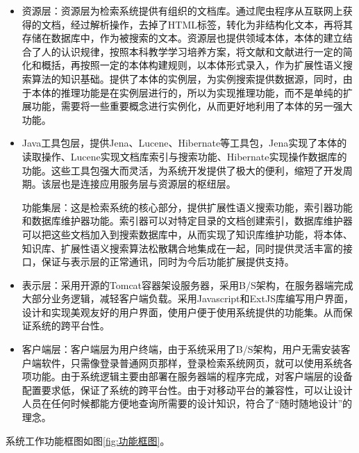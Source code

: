 \documentclass[12pt,a4paper]{article}
\begin{document}
	\begin{itemize}
	 	\item
	资源层：资源层为检索系统提供有组织的文档库。通过爬虫程序从互联网上获得的文档，经过解析操作，去掉了{\Times HTML}标签，转化为非结构化文本，再将其存储在数据库中，作为被搜索的文本。资源层也提供领域本体，本体的建立结合了人的认识规律，按照本科教学学习培养方案，将文献\cite{2005shen}和文献\cite{2008liu}进行一定的简化和概括，再按照一定的本体构建规则，以本体形式录入，作为扩展性语义搜索算法的知识基础。提供了本体的实例层，为实例搜索提供数据源，同时，由于本体的推理功能是在实例层进行的，所以为实现推理功能，而不是单纯的扩展功能，需要将一些重要概念进行实例化，从而更好地利用了本体的另一强大功能。
		\item
	{\Times Java}工具包层，提供{\Times Jena}、{\Times Lucene}、{\Times Hibernate}等工具包，{\Times Jena}实现了本体的读取操作、{\Times Lucene}实现文档库索引与搜索功能、{\Times Hibernate}实现操作数据库的功能。这些工具包强大而灵活，为系统开发提供了极大的便利，缩短了开发周期。该层也是连接应用服务层与资源层的枢纽层。
	
	功能集层：这是检索系统的核心部分，提供扩展性语义搜索功能，索引器功能和数据库维护器功能。索引器可以对特定目录的文档创建索引，数据库维护器可以把这些文档加入到搜索数据库中，从而实现了知识库维护功能，将本体、知识库、扩展性语义搜索算法松散耦合地集成在一起，同时提供灵活丰富的接口，保证与表示层的正常通讯，同时为今后功能扩展提供支持。
		\item
	表示层：采用开源的{\Times Tomcat}容器架设服务器，采用{\Times B/S}架构，在服务器端完成大部分业务逻辑，减轻客户端负载。采用{\Times Javascript}和{\Times ExtJS}库编写用户界面，设计和实现美观友好的用户界面，使用户便于使用系统提供的功能集。从而保证系统的跨平台性。
		\item
	客户端层：客户端层为用户终端，由于系统采用了{\Times B/S}架构，用户无需安装客户端软件，只需像登录普通网页那样，登录检索系统网页，就可以使用系统各项功能。由于系统逻辑主要由部署在服务器端的程序完成，对客户端层的设备配置要求低，保证了系统的跨平台性。由于对移动平台的兼容性，可以让设计人员在任何时候都能方便地查询所需要的设计知识，符合了“随时随地设计”的理念。
	
	\end{itemize}
	
	系统工作功能框图如图\ref{fig:功能框图}。
	
\end{document}
